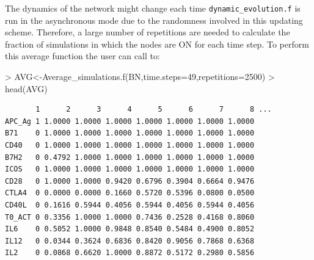 \documentclass[a4paper]{article}
\begin{document}
The dynamics of the network might change each time \texttt{dynamic\_evolution.f} is run in the asynchronous mode  due to the randomness involved in this updating scheme. Therefore, a large number of repetitions are needed to calculate the fraction of simulations in which the nodes are ON for each time step. To perform this average function the user can call to:
\begin{Schunk}
\begin{Sinput}
> AVG<-Average_simulations.f(BN,time.steps=49,repetitions=2500)
> head(AVG)
\end{Sinput}
\end{Schunk}
\begin{verbatim}
       1      2      3      4      5      6      7      8 ...
APC_Ag 1 1.0000 1.0000 1.0000 1.0000 1.0000 1.0000 1.0000
B71    0 1.0000 1.0000 1.0000 1.0000 1.0000 1.0000 1.0000
CD40   0 1.0000 1.0000 1.0000 1.0000 1.0000 1.0000 1.0000
B7H2   0 0.4792 1.0000 1.0000 1.0000 1.0000 1.0000 1.0000
ICOS   0 1.0000 1.0000 1.0000 1.0000 1.0000 1.0000 1.0000
CD28   0 1.0000 1.0000 0.9420 0.6796 0.3904 0.6664 0.9476
CTLA4  0 0.0000 0.0000 0.1660 0.5720 0.5396 0.0800 0.0500
CD40L  0 0.1616 0.5944 0.4056 0.5944 0.4056 0.5944 0.4056
T0_ACT 0 0.3356 1.0000 1.0000 0.7436 0.2528 0.4168 0.8060
IL6    0 0.5052 1.0000 0.9848 0.8540 0.5484 0.4900 0.8052
IL12   0 0.0344 0.3624 0.6836 0.8420 0.9056 0.7868 0.6368
IL2    0 0.0868 0.6620 1.0000 0.8872 0.5172 0.2980 0.5856
\end{verbatim}
\end{document}

